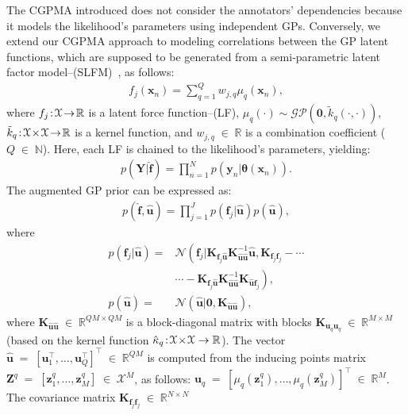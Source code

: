 \documentclass[journal]{IEEEtran}
\providecommand{\ve}[1]{{\bm{#1}}}%
\providecommand{\mat}[1]{{\bm{#1}}} %
\newcommand{\Real}{\mathbb{R}}
\DeclareMathOperator{\en}{\!\,\in\!\,}
\DeclareMathOperator{\igual}{\!\,=\!\,}
\providecommand{\s}[1]{\negthinspace#1\negthinspace}%
\providecommand{\ve}[1]{{\mathbf{#1}}}
\providecommand{\mat}[1]{{\mathbf{#1}}}
\newcommand{\boldx}{\mathbf{x}}
\newcommand{\gauss}{\mathcal{N}} %
\begin{document}
The CGPMA introduced does not consider the annotators' dependencies because it models the likelihood's parameters using independent GPs. 
Conversely, we extend our CGPMA approach to modeling correlations between the GP latent functions, which are supposed to be generated from a semi-parametric latent factor model--(SLFM)~\cite{teh2005semiparametric}, as follows:
\begin{align}
\label{eq:SLFM}
f_j(\ve{x}_n) = \sum_{q=1}^{Q} w_{j,q} \mu_{q}(\boldx_n),
\end{align}
where $f_j\s{:}\mathcal{X}\s{\to}\Real$ is a latent force function--(LF), $\mu_q(\cdot) \sim \mathcal{GP}(\mathbf{0}, \tilde{k}_q(\cdot, \cdot))$, $\tilde{k}_q\s{:}\mathcal{X}\s{\times}\mathcal{X}\s{\to}\Real$ is a kernel function, and $w_{j,q}\en\Real$ is a combination coefficient ($Q\en\mathbb{N}$). Here, each LF is chained to the likelihood's parameters, yielding:
\begin{align}
p(\mat{Y}|\hat{\ve{f}}) = \prod_{n=1}^{N}p(\ve{y}_n|\bm{\theta}(\ve{x}_n)).
\end{align} 
The augmented GP prior can be expressed as:
\begin{align}
\label{eq:CCGPpri}
p(\hat{\ve{f}}, \hat{\ve{u}}) = \prod_{j=1}^{J}p(\ve{f}_j|\hat{\ve{u}})p(\hat{\ve{u}}),
\end{align}
where
\begin{align}
p(\ve{f}_j|\hat{\ve{u}})=& \gauss\left(\ve{f}_j|\mat{K}_{\ve{f}_j\hat{\ve{u}}}\mat{K}^{-1}_{\hat{\ve{u}}\hat{\ve{u}}}\hat{\ve{u}},\mat{K}_{\ve{f}_j\ve{f}_j}\right.-\cdots \nonumber\\
&\cdots-\left.\mat{K}_{\ve{f}_j\hat{\ve{u}}}\mat{K}^{-1}_{\hat{\ve{u}}\hat{\ve{u}}}\mat{K}_{\hat{\ve{u}}\ve{f}_j}\right),\\
p(\hat{\ve{u}}) =& \gauss\left(\hat{\ve{u}}| \ve{0}, \mat{K}_{\hat{\ve{u}}\hat{\ve{u}}}\right),
\end{align}
where $\mat{K}_{\hat{\ve{u}}\hat{\ve{u}}} \en \Real^{QM\times QM}$ is a block-diagonal matrix with blocks $\mat{K}_{\ve{u}_q\ve{u}_q}\en \Real^{M\times M}$ (based on the kernel function $\hat{\kappa}_q\s{:}\mathcal{X}\s{\times}\mathcal{X}\to \Real$). The vector $\hat{\ve{u}} \igual \left[\ve{u}_1^{\top}, \dots , \ve{u}_Q^{\top} \right]^{\top} \en \Real^{QM}$ is computed from the inducing points matrix $\mat{Z}^q\igual\left[\ve{z}_1^q, \dots , \ve{z}_M^q\right]\en\mathcal{X}^{M}$, as follows: $\ve{u}_q\igual \left[\mu_q(\ve{z}_1^q), \dots , \mu_q(\ve{z}_M^q)\right]^{\top}\en\Real^{M}$.
The covariance matrix $\mat{K}_{\ve{f}_j\ve{f}_j}\en \Real^{N\times N}$ 
\end{document}
